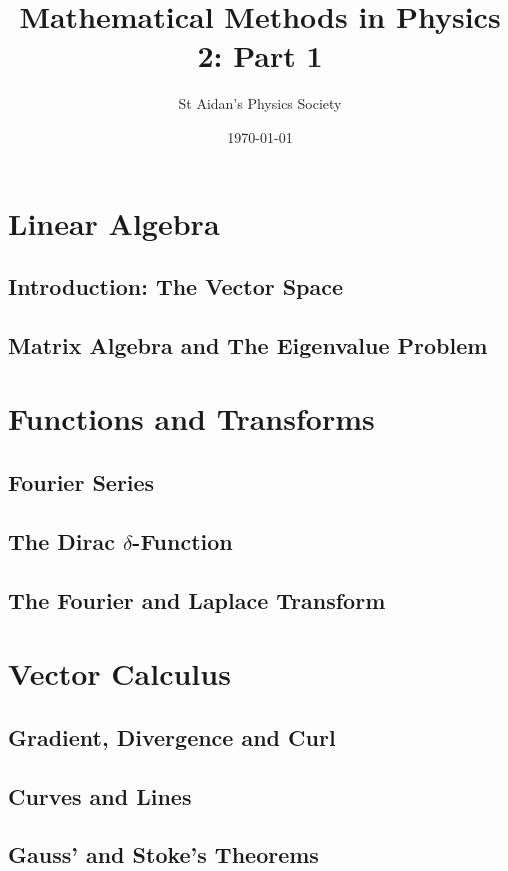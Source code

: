 \documentclass{physics_notes}
\title{Mathematical Methods in Physics 2: Part 1}
\author{St Aidan's Physics Society}
\date{\today}
\begin{document}
\maketitle


\tableofcontents
\newpage

\section{Linear Algebra}
\subsection{Introduction: The Vector Space}
\subsection{Matrix Algebra and The Eigenvalue Problem}


\section{Functions and Transforms}
\subsection{Fourier Series} %
\subsection{The Dirac $\delta$-Function}
\subsection{The Fourier and Laplace Transform}

\section{Vector Calculus}
\subsection{Gradient, Divergence and Curl}
\subsection{Curves and Lines}
\subsection{Gauss' and Stoke's Theorems}  
\end{document}

